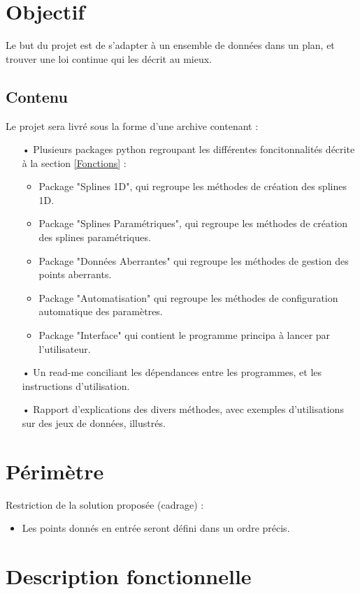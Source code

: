 \documentclass[a4paper,12pt]{article}
\begin{document}
\section{Objectif}

Le but du projet est de s'adapter à un ensemble de données dans un plan, et trouver une loi continue qui les décrit au mieux.

\subsection*{Contenu}
Le projet sera livré sous la forme d'une archive contenant :
\begin{itemize}
\item[•] Plusieurs packages python regroupant les différentes foncitonnalités décrite à la section \ref{Fonctions}  : 
\begin{itemize}
\item Package "Splines 1D", qui regroupe les méthodes de création des splines 1D.
\item Package "Splines Paramétriques", qui regroupe les méthodes de création des splines paramétriques.
\item Package "Données Aberrantes" qui regroupe les méthodes de gestion des points aberrants.
\item Package "Automatisation" qui regroupe les méthodes de configuration automatique des paramètres.
\item Package "Interface" qui contient le programme principa à lancer par l'utilisateur.
\end{itemize}
\item[•] Un read-me conciliant les dépendances entre les programmes, et les instructions d'utilisation.
\item[•] Rapport d'explications des divers méthodes, avec exemples d’utilisations sur des jeux de données, illustrés.
\end{itemize}

\section{Périmètre}

Restriction de la solution proposée (cadrage) :
\begin{itemize}
\item Les points donnés en entrée seront défini dans un ordre précis.
\end{itemize}

\section{Description fonctionnelle}
\end{document}
